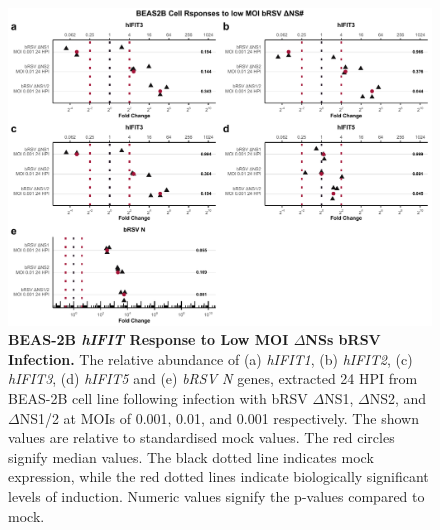 \begin{figure}
    \centering
    \includegraphics[width=1\linewidth]{06. Chapter 1/Figs/01. Induction/12. beas2b_brsv_dns.pdf}
    \caption[BEAS-2B \textit{hIFIT} Response to Low MOI \(\Delta\)NSs bRSV Infection.]{\textbf{BEAS-2B \textit{hIFIT} Response to Low MOI \(\Delta\)NSs bRSV Infection.} The relative abundance of (a) \textit{hIFIT1}, (b) \textit{hIFIT2}, (c) \textit{hIFIT3}, (d) \textit{hIFIT5} and (e) \textit{bRSV N} genes, extracted 24 HPI from BEAS-2B cell line following infection with bRSV \(\Delta\)NS1, \(\Delta\)NS2, and \(\Delta\)NS1/2 at MOIs of 0.001, 0.01, and 0.001 respectively. The shown values are relative to standardised mock values. The red circles signify median values. The black dotted line indicates mock expression, while the red dotted lines indicate biologically significant levels of induction. Numeric values signify the p-values compared to mock.}
    \label{fig:BEAS-2B responses to bRSV dNSs.}
\end{figure}


